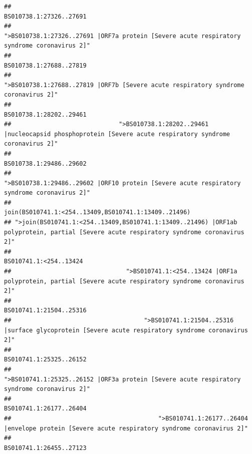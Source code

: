 \documentclass[
]{article}
\begin{document}
\begin{verbatim}
##                                                                                                                BS010738.1:27326..27691 
##                                            ">BS010738.1:27326..27691 |ORF7a protein [Severe acute respiratory syndrome coronavirus 2]" 
##                                                                                                                BS010738.1:27688..27819 
##                                                    ">BS010738.1:27688..27819 |ORF7b [Severe acute respiratory syndrome coronavirus 2]" 
##                                                                                                                BS010738.1:28202..29461 
##                              ">BS010738.1:28202..29461 |nucleocapsid phosphoprotein [Severe acute respiratory syndrome coronavirus 2]" 
##                                                                                                                BS010738.1:29486..29602 
##                                            ">BS010738.1:29486..29602 |ORF10 protein [Severe acute respiratory syndrome coronavirus 2]" 
##                                                                                   join(BS010741.1:<254..13409,BS010741.1:13409..21496) 
## ">join(BS010741.1:<254..13409,BS010741.1:13409..21496) |ORF1ab polyprotein, partial [Severe acute respiratory syndrome coronavirus 2]" 
##                                                                                                                 BS010741.1:<254..13424 
##                                ">BS010741.1:<254..13424 |ORF1a polyprotein, partial [Severe acute respiratory syndrome coronavirus 2]" 
##                                                                                                                BS010741.1:21504..25316 
##                                     ">BS010741.1:21504..25316 |surface glycoprotein [Severe acute respiratory syndrome coronavirus 2]" 
##                                                                                                                BS010741.1:25325..26152 
##                                            ">BS010741.1:25325..26152 |ORF3a protein [Severe acute respiratory syndrome coronavirus 2]" 
##                                                                                                                BS010741.1:26177..26404 
##                                         ">BS010741.1:26177..26404 |envelope protein [Severe acute respiratory syndrome coronavirus 2]" 
##                                                                                                                BS010741.1:26455..27123 

\end{verbatim}
\end{document}
